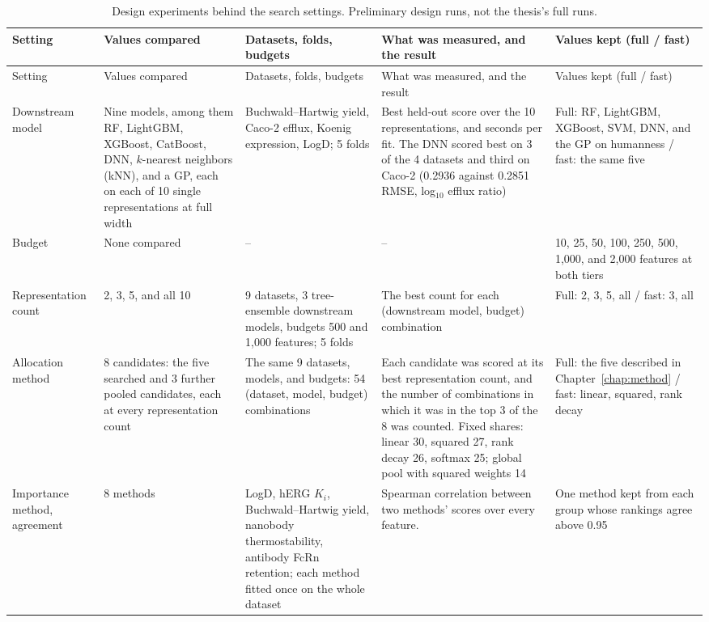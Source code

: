 {\footnotesize
\begin{longtable}{@{}P{2.6cm}P{2.5cm}P{2.7cm}P{3.5cm}P{2.5cm}@{}}
\caption{Design experiments behind the search settings. Preliminary design runs, not the thesis's full runs.}
\label{tab:add:design_experiments}\\
\toprule
Setting & Values compared & Datasets, folds, budgets & What was measured, and the result & Values kept (full / fast) \\
\midrule
\endfirsthead
\toprule
Setting & Values compared & Datasets, folds, budgets & What was measured, and the result & Values kept (full / fast) \\
\midrule
\endhead
Downstream model & Nine models, among them RF, LightGBM, XGBoost, CatBoost, DNN, $k$-nearest neighbors (kNN), and a GP, each on each of 10 single representations at full width & Buchwald--Hartwig yield, Caco-2 efflux, Koenig expression, LogD; 5 folds & Best held-out score over the 10 representations, and seconds per fit. The DNN scored best on 3 of the 4 datasets and third on Caco-2 (0.2936 against 0.2851 RMSE, log$_{10}$ efflux ratio) & Full: RF, LightGBM, XGBoost, SVM, DNN, and the GP on humanness / fast: the same five \\
\addlinespace
Budget & None compared & -- & -- & 10, 25, 50, 100, 250, 500, 1{,}000, and 2{,}000 features at both tiers \\
\addlinespace
Representation count & 2, 3, 5, and all 10 & 9 datasets, 3 tree-ensemble downstream models, budgets 500 and 1{,}000 features; 5 folds & The best count for each (downstream model, budget) combination & Full: 2, 3, 5, all / fast: 3, all \\
\addlinespace
Allocation method & 8 candidates: the five searched and 3 further pooled candidates, each at every representation count & The same 9 datasets, models, and budgets: 54 (dataset, model, budget) combinations & Each candidate was scored at its best representation count, and the number of combinations in which it was in the top 3 of the 8 was counted. Fixed shares: linear 30, squared 27, rank decay 26, softmax 25; global pool with squared weights 14 & Full: the five described in Chapter~\ref{chap:method} / fast: linear, squared, rank decay \\
\addlinespace
Importance method, agreement & 8 methods & LogD, hERG $K_i$, Buchwald--Hartwig yield, nanobody thermostability, antibody FcRn retention; each method fitted once on the whole dataset & Spearman correlation between two methods' scores over every feature. & One method kept from each group whose rankings agree above 0.95 \\

\end{longtable}}
